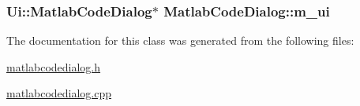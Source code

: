 \hypertarget{class_matlab_code_dialog_37010744fc03886b3a052d2a655ce90a}{
\subsubsection[{m\_\-ui}]{\setlength{\rightskip}{0pt plus 5cm}Ui::MatlabCodeDialog$\ast$ {\bf MatlabCodeDialog::m\_\-ui}}}
\label{class_matlab_code_dialog_37010744fc03886b3a052d2a655ce90a}




The documentation for this class was generated from the following files:\begin{CompactItemize}
\item 
\hyperlink{matlabcodedialog_8h}{matlabcodedialog.h}\item 
\hyperlink{matlabcodedialog_8cpp}{matlabcodedialog.cpp}\end{CompactItemize}
